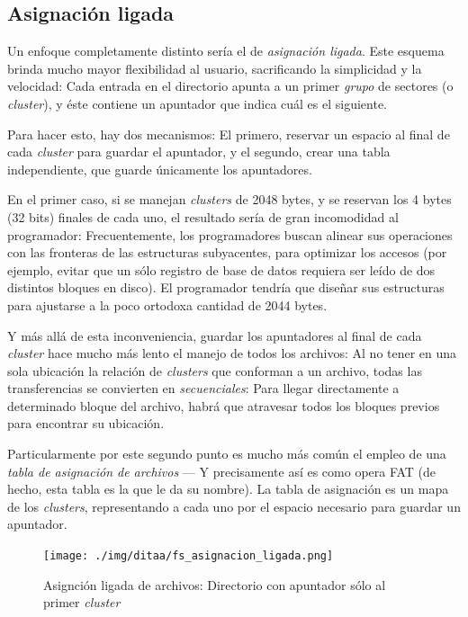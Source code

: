 \documentclass[11pt,fleqn]{book} %
\begin{document}
\subsection{Asignación ligada}
\label{sec-7-2-2}


Un enfoque completamente distinto sería el de \emph{asignación ligada}. Este esquema brinda mucho mayor flexibilidad al usuario,
sacrificando la simplicidad y la velocidad: Cada entrada en el
directorio apunta a un primer \emph{grupo} de sectores (o \emph{cluster}), y
éste contiene un apuntador que indica cuál es el siguiente.

Para hacer esto, hay dos mecanismos: El primero, reservar un espacio
al final de cada \emph{cluster} para guardar el apuntador, y el segundo,
crear una tabla independiente, que guarde únicamente los apuntadores.

En el primer caso, si se manejan \emph{clusters} de 2048 bytes, y se reservan
los 4 bytes (32 bits) finales de cada uno, el resultado sería de gran
incomodidad al programador: Frecuentemente, los programadores buscan
alinear sus operaciones con las fronteras de las estructuras
subyacentes, para optimizar los accesos (por ejemplo, evitar que un
sólo registro de base de datos requiera ser leído de dos distintos
bloques en disco). El programador tendría que diseñar sus estructuras
para ajustarse a la poco ortodoxa cantidad de 2044 bytes.

Y más allá de esta inconveniencia, guardar los apuntadores al final de
cada \emph{cluster} hace mucho más lento el manejo de todos los archivos:
Al no tener en una sola ubicación la relación de \emph{clusters} que conforman
a un archivo, todas las transferencias se convierten en
\emph{secuenciales}: Para llegar directamente a
determinado bloque del archivo, habrá que atravesar todos los bloques
previos para encontrar su ubicación.

Particularmente por este segundo punto es mucho más común el empleo de
una \emph{tabla de asignación de archivos} — Y precisamente así es como
opera FAT (de hecho, esta tabla es la que le da su nombre). La tabla
de asignación es un mapa de los \emph{clusters}, representando a cada uno por
el espacio necesario para guardar un apuntador.

\begin{figure}[htb]
\centering
\texttt{[image: ./img/ditaa/fs\_asignacion\_ligada.png]}
\caption{\label{FS_fs_asignacion_ligada}Asignción ligada de archivos: Directorio con apuntador sólo al primer \emph{cluster}}
\end{figure}
\end{document}
